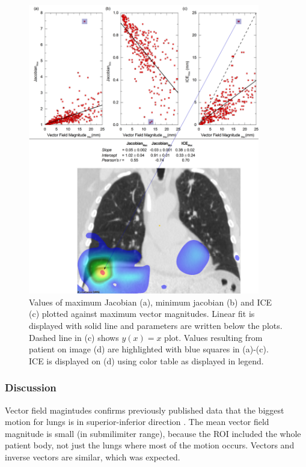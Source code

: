 \documentclass[type=dr, dr=rernat, accentcolor=tud7b,colorbacktitle, bigchapter, openright, twoside, 12pt ]{tudthesis}
\begin{document}
\begin{figure}[H]
	\begin{center}		
		\includegraphics[width=0.9\textwidth]{./Images/maxVf_lung.png}
		\caption{Values of maximum Jacobian (a), minimum jacobian (b) and ICE (c) plotted against maximum vector magnitudes. Linear fit is displayed with solid line and parameters are written below the plots. Dashed line in (c) shows $y(x)= x$ plot. Values resulting from patient on image (d) are highlighted with blue squares in (a)-(c).
			ICE is displayed on (d) using color table as displayed in legend.}
		\label{maxvf}
	\end{center}
\end{figure}



\subsubsection{Discussion}

Vector field magintudes confirms previously published data that the biggest motion for lungs is in superior-inferior direction \cite{Seppenwoolde2002, Britton2007, Liu2007}. The mean vector field magnitude is small (in submilimiter range), 
because the ROI included the whole patient body, not just the lungs where most of the motion occurs. Vectors and inverse vectors are similar, which was expected.
\end{document}
